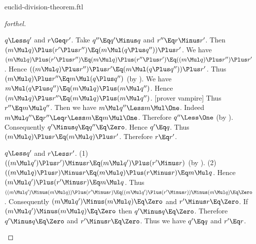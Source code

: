 \documentclass{stex}
\begin{document}
\begin{smodule}{euclid-division-theorem.ftl}
\begin{proof}[forthel]
  \begin{case}{$q \Less q'$ and $r \Geq r'$.}
    Take $q'' \Eq q' \Minus q$ and $r'' \Eq r \Minus r'$.
    Then $(m \Mul q) \Plus (r' \Plus r'') \Eq (m \Mul (q \Plus q'')) \Plus r'$.
    We have $(m \Mul q) \Plus (r' \Plus r'')
      \Eq (m \Mul q) \Plus (r'' \Plus r')
      \Eq ((m \Mul q) \Plus r'') \Plus r'$.
    Hence $((m \Mul q) \Plus r'') \Plus r' \Eq (m \Mul (q \Plus q'')) \Plus r'$.
    Thus $(m \Mul q) \Plus r'' \Eq m \Mul (q \Plus q'')$ (by ).
    We have $m \Mul (q \Plus q'') \Eq (m \Mul q) \Plus (m \Mul q'')$.
    Hence $(m \Mul q) \Plus r'' \Eq (m \Mul q) \Plus (m \Mul q'')$.
    [prover vampire]
    Thus $r'' \Eq m \Mul q''$.
    Then we have $m \Mul q'' \Less m \Mul \One$.
    Indeed $m \Mul q''
      \Eq r''
      \Leq r
      \Less m
      \Eq m \Mul \One$.
    Therefore $q'' \Less \One$ (by ).
    Consequently $q' \Minus q \Eq q'' \Eq \Zero$.
    Hence $q' \Eq q$.
    Thus $(m \Mul q) \Plus r \Eq (m \Mul q) \Plus r'$.
    Therefore $r \Eq r'$.
  \end{case}

  \begin{case}{$q \Less q'$ and $r \Less r'$.}
    (1) $((m \Mul q') \Plus r') \Minus r \Eq (m \Mul q') \Plus (r' \Minus r)$ (by ).
    (2) $((m \Mul q) \Plus r) \Minus r
      \Eq (m \Mul q) \Plus (r \Minus r)
      \Eq m \Mul q$.
    Hence $(m \Mul q') \Plus (r' \Minus r) \Eq m \Mul q$.
    Thus $((m \Mul q') \Minus (m \Mul q)) \Plus (r' \Minus r)
      \Eq ((m \Mul q') \Plus (r' \Minus r)) \Minus (m \Mul q)
      \Eq \Zero$.
    Consequently $(m \Mul q') \Minus (m \Mul q) \Eq \Zero$ and $r' \Minus r \Eq \Zero$.
    If $(m \Mul q') \Minus (m \Mul q) \Eq \Zero$ then $q' \Minus q \Eq \Zero$.
    Therefore $q' \Minus q \Eq \Zero$ and $r' \Minus r \Eq \Zero$.
    Thus we have $q' \Eq q$ and $r' \Eq r$.
  \end{case}
\end{proof}
\end{smodule}
\end{document}
